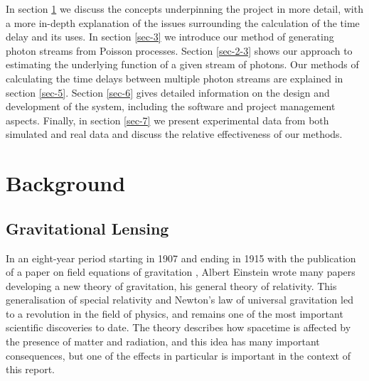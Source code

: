 \documentclass[a4paper,11pt]{article}
\begin{document}
In section \ref{sec-2} we discuss the concepts underpinning the project in more
detail, with a more in-depth explanation of the issues surrounding the
calculation of the time delay and its uses. In section \ref{sec-3} we introduce our method of generating photon streams from Poisson
processes. Section \ref{sec-2-3} shows our approach to estimating the
underlying function of a given stream of photons. Our methods of calculating the
time delays between multiple photon streams are explained in section \ref{sec-5}. Section \ref{sec-6} gives detailed information on the design and
development of the system, including the software and project management
aspects. Finally, in section \ref{sec-7} we present experimental data from both
simulated and real data and discuss the relative effectiveness of our methods.
\section{Background}
\label{sec-2}
\subsection{Gravitational Lensing}
\label{sec-2-1}

In an eight-year period starting in 1907 and ending in 1915 with the publication
of a paper on field equations of gravitation \cite{einstein1915general}, Albert
Einstein wrote many papers developing a new theory of gravitation, his general
theory of relativity. This generalisation of special relativity and Newton's law
of universal gravitation led to a revolution in the field of physics, and
remains one of the most important scientific discoveries to date. The theory
describes how spacetime is affected by the presence of matter and radiation, and
this idea has many important consequences, but one of the effects in particular
is important in the context of this report.
\end{document}
